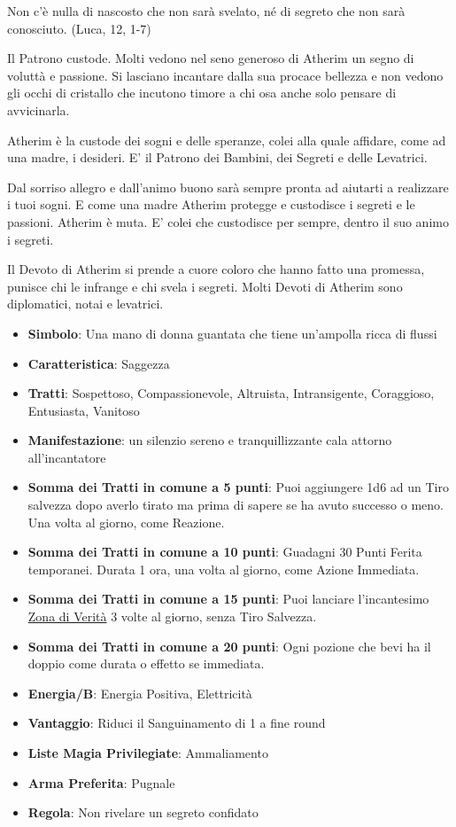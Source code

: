 \begin{multicols}{2}
\begin{enfasi}
{Non c'è nulla di nascosto che non sarà svelato, né di segreto che non sarà conosciuto. (Luca, 12, 1-7)
}\end{enfasi}

Il Patrono custode. Molti vedono nel seno generoso di Atherim un segno di voluttà e passione. Si lasciano incantare dalla sua procace bellezza e non vedono gli occhi di cristallo che incutono timore a chi osa anche solo pensare di avvicinarla.

Atherim è la custode dei sogni e delle speranze, colei alla quale affidare, come ad una madre, i desideri. E' il Patrono dei Bambini, dei Segreti e delle Levatrici.

Dal sorriso allegro e dall'animo buono sarà sempre pronta ad aiutarti a realizzare i tuoi sogni. E come una madre Atherim protegge e custodisce i segreti e le passioni. Atherim è muta. E' colei che custodisce per sempre, dentro il suo animo i segreti.

Il Devoto di Atherim si prende a cuore coloro che hanno fatto una promessa, punisce chi le infrange e chi svela i segreti. Molti Devoti di Atherim sono diplomatici, notai e levatrici.

\begin{itemize}[leftmargin=*] \setlength{\itemsep}{0pt}
\item \textbf{Simbolo}: Una mano di donna guantata che tiene un'ampolla ricca di flussi
\item \textbf{Caratteristica}: Saggezza
\item \textbf{Tratti}: Sospettoso, Compassionevole, Altruista, Intransigente, Coraggioso, Entusiasta, Vanitoso
\item \textbf{Manifestazione}: un silenzio sereno e tranquillizzante cala attorno all'incantatore
\item \textbf{Somma dei Tratti in comune a 5 punti}: Puoi aggiungere 1d6 ad un Tiro salvezza dopo averlo tirato ma prima di sapere se ha avuto successo o meno. Una volta al giorno, come Reazione.
\item \textbf{Somma dei Tratti in comune a 10 punti}: Guadagni 30 Punti Ferita temporanei. Durata 1 ora, una volta al giorno, come Azione Immediata.
\item \textbf{Somma dei Tratti in comune a 15 punti}: Puoi lanciare l'incantesimo \hyperlink{Zona di Verità}{Zona di Verità} 3 volte al giorno, senza Tiro Salvezza.
\item \textbf{Somma dei Tratti in comune a 20 punti}: Ogni pozione che bevi ha il doppio come durata o effetto se immediata.
\item \textbf{Energia/B}: Energia Positiva, Elettricità
\item \textbf{Vantaggio}: Riduci il Sanguinamento di 1 a fine round
\item \textbf{Liste Magia Privilegiate}: Ammaliamento
\item \textbf{Arma Preferita}: Pugnale
\item \textbf{Regola}: Non rivelare un segreto confidato
\end{itemize}


\end{multicols}
